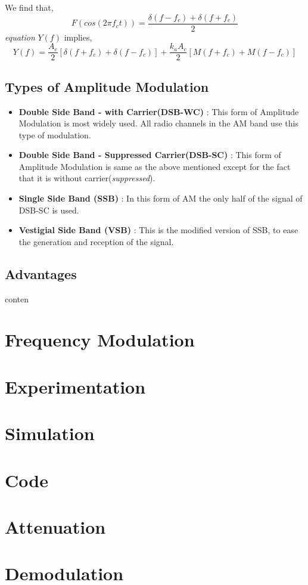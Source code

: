 \documentclass[12pt,a4paper]{article}%
\begin{document}
\begin{flushleft}
\begin{center}
		\end{center}
		We find that,
		\begin{equation}
			F(cos(2 \pi f_c t))=\dfrac{\delta(f-f_c)+\delta(f+f_c)}{2}
		\end{equation}
		\textit{equation} $Y(f)$ implies,
		\begin{equation}
		Y(f)=\dfrac{A_c}{2}[\delta(f+f_c)+\delta(f-f_c)]+\dfrac{k_a A_c}{2}[M(f+f_c)+M(f-f_c)]
		\end{equation}
		\subsection{Types of Amplitude Modulation}
		\begin{flushleft}
			\begin{itemize}
				\item{\textbf{Double Side Band - with Carrier(DSB-WC)} : This form of Amplitude Modulation is most widely used. All radio channels in the AM band use this type of modulation.}
				\item{\textbf{Double Side Band - Suppressed Carrier(DSB-SC)} : This form of Amplitude Modulation is same as the above mentioned except for the fact that it is without carrier(\textit{suppressed}).}
				\item{\textbf{Single Side Band (SSB)} : In this form of AM the only half of the signal of DSB-SC is used.}
				\item{\textbf{Vestigial Side Band (VSB)} : This is the modified version of SSB, to ease the generation and reception of the signal.}
			\end{itemize}
		\end{flushleft}
		\subsection{Advantages}
		\begin{flushleft}
			conten
		\end{flushleft}
	\end{flushleft}
	\pagebreak
	\section{Frequency Modulation}
	\pagebreak
	\section{Experimentation}
	\pagebreak
	\section{Simulation}
	\pagebreak
	\section{Code}
	\pagebreak
	\section{Attenuation}
	\pagebreak
	\section{Demodulation}
	\pagebreak
 	
\end{document}
